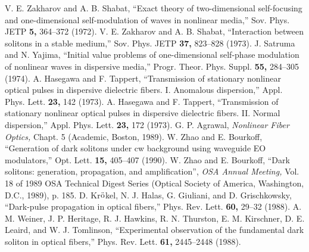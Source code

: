 \begin{references}
V. E. Zakharov and A. B. Shabat, ``Exact theory of two-dimensional
self-focusing and one-dimensional self-modulation of waves in nonlinear
media,'' Sov. Phys. JETP {\bf 5,} 364--372 (1972).
V. E. Zakharov and A. B. Shabat, ``Interaction between solitons in
a stable medium,'' Sov. Phys. JETP {\bf 37,} 823--828 (1973).
J. Satruma and N. Yajima, ``Initial value problems of one-dimensional
self-phase modulation of nonlinear waves in dispersive media,'' Progr.
Theor. Phys. Suppl. {\bf 55,} 284--305 (1974).
A. Hasegawa and F. Tappert, ``Transmission of stationary nonlinear
optical pulses in dispersive dielectric fibers. I. Anomalous
dispersion,'' Appl. Phys. Lett. {\bf 23,} 142 (1973).
A. Hasegawa and F. Tappert, ``Transmission of stationary nonlinear
optical pulses in dispersive dielectric fibers. II. Normal
dispersion,'' Appl. Phys. Lett. {\bf 23,} 172 (1973).
G. P. Agrawal, {\it Nonlinear Fiber Optics,} Chapt. 5 (Academic,
Boston, 1989).
W. Zhao and E. Bourkoff, ``Generation of dark solitons under cw background
using waveguide EO modulators,'' Opt. Lett. {\bf 15,} 405--407 (1990).
W. Zhao and E. Bourkoff, ``Dark solitons: generation, propagation,
and amplification'', {\it OSA Annual Meeting,} Vol. 18 of 1989 OSA
Technical Digest Series (Optical
Society of America, Washington, D.C., 1989), p. 185.
D. Kr$\rm {\ddot o}$kel, N. J. Halas, G. Giuliani, and D. Grischkowsky,
``Dark-pulse propagation in optical fibers,''
Phys. Rev. Lett. {\bf 60,} 29--32 (1988).
A. M. Weiner, J. P. Heritage, R. J. Hawkins, R. N. Thurston, E. M.
Kirschner, D. E. Leaird, and W. J. Tomlinson, ``Experimental
observation of the fundamental dark soliton in optical fibers,''
Phys. Rev. Lett. {\bf 61,} 2445--2448 (1988).
\end{references}

